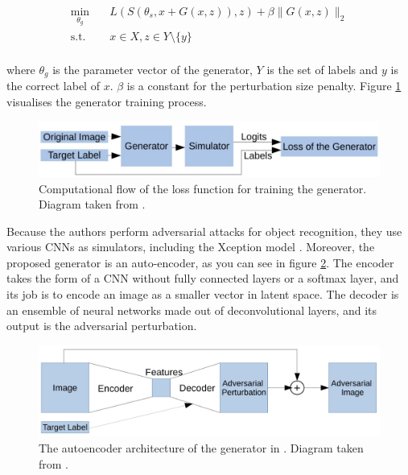 \begin{equation}
\begin{aligned}
\min_{\theta_g} \quad & L(S(\theta_s, x + G(x, z)),z) + \beta\|G(x,z)\|_2\\
\textrm{s.t.} \quad & x \in X, z \in Y \setminus \{y\}\\
\label{eq:generator_loss}
\end{aligned}
\end{equation}

\noindent where $\theta_g$ is the parameter vector of the generator, $Y$ is the set of labels and $y$ is the correct label of $x$. $\beta$ is a constant for the perturbation size penalty. Figure \ref{fig:generator_loss} visualises the generator training process.

\begin{figure}[h]
    \centering
    \includegraphics[width=1\textwidth]{graphics/generator_loss.JPG}
    \caption{Computational flow of the loss function for training the generator. Diagram taken from \cite{zheng_black_box_GAN}.}
    \label{fig:generator_loss}
\end{figure}

Because the authors perform adversarial attacks for object recognition, they use various CNNs as simulators, including the Xception model \cite{xception}. Moreover, the proposed generator is an auto-encoder, as you can see in figure \ref{fig:generator}. The encoder takes the form of a CNN without fully connected layers or a softmax layer, and its job is to encode an image as a smaller vector in latent space. The decoder is an ensemble of neural networks made out of deconvolutional layers, and its output is the adversarial perturbation. 

\begin{figure}[h]
    \centering
    \includegraphics[width=1\textwidth]{graphics/generator.JPG}
    \caption{The autoencoder architecture of the generator in \cite{zheng_black_box_GAN}. Diagram taken from \cite{zheng_black_box_GAN}.}
    \label{fig:generator}
\end{figure}

